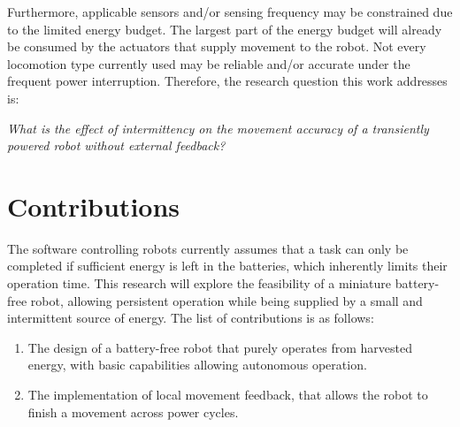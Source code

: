 Furthermore, applicable sensors and/or sensing frequency may be constrained due to the limited energy budget.
The largest part of the energy budget will already be consumed by the actuators that supply movement to the robot.
Not every locomotion type currently used may be reliable and/or accurate under the frequent power interruption.
Therefore, the research question this work addresses is:

\begin{center}
	\textit{What is the effect of intermittency on the movement accuracy of a transiently powered robot without external feedback?}
\end{center}

\section{Contributions}
The software controlling robots currently assumes that a task can only be completed if sufficient energy is left in the batteries, which inherently limits their operation time. 
This research will explore the feasibility of a miniature battery-free robot, allowing persistent operation while being supplied by a small and intermittent source of energy.
The list of contributions is as follows:

\begin{enumerate}


\item The design of a battery-free robot that purely operates from harvested energy, with basic capabilities allowing autonomous operation.

\item The implementation of local movement feedback, that allows the robot to finish a movement across power cycles.


\end{enumerate}


